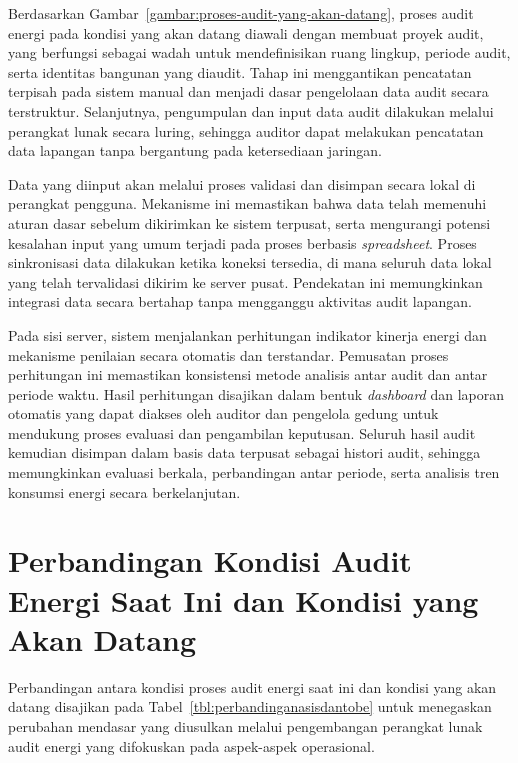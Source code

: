 Berdasarkan Gambar~\ref{gambar:proses-audit-yang-akan-datang}, proses audit energi pada kondisi yang akan datang diawali dengan membuat proyek audit, yang berfungsi sebagai wadah untuk mendefinisikan ruang lingkup, periode audit, serta identitas bangunan yang diaudit. Tahap ini menggantikan pencatatan terpisah pada sistem manual dan menjadi dasar pengelolaan data audit secara terstruktur. Selanjutnya, pengumpulan dan input data audit dilakukan melalui perangkat lunak secara luring, sehingga auditor dapat melakukan pencatatan data lapangan tanpa bergantung pada ketersediaan jaringan.

Data yang diinput akan melalui proses validasi dan disimpan secara lokal di perangkat pengguna. Mekanisme ini memastikan bahwa data telah memenuhi aturan dasar sebelum dikirimkan ke sistem terpusat, serta mengurangi potensi kesalahan input yang umum terjadi pada proses berbasis \textit{spreadsheet}. Proses sinkronisasi data dilakukan ketika koneksi tersedia, di mana seluruh data lokal yang telah tervalidasi dikirim ke server pusat. Pendekatan ini memungkinkan integrasi data secara bertahap tanpa mengganggu aktivitas audit lapangan.

Pada sisi server, sistem menjalankan perhitungan indikator kinerja energi dan mekanisme penilaian secara otomatis dan terstandar. Pemusatan proses perhitungan ini memastikan konsistensi metode analisis antar audit dan antar periode waktu. Hasil perhitungan disajikan dalam bentuk \textit{dashboard} dan laporan otomatis yang dapat diakses oleh auditor dan pengelola gedung untuk mendukung proses evaluasi dan pengambilan keputusan. Seluruh hasil audit kemudian disimpan dalam basis data terpusat sebagai histori audit, sehingga memungkinkan evaluasi berkala, perbandingan antar periode, serta analisis tren konsumsi energi secara berkelanjutan.

\section{Perbandingan Kondisi Audit Energi Saat Ini dan Kondisi yang Akan Datang}
Perbandingan antara kondisi proses audit energi saat ini dan kondisi yang akan datang disajikan pada Tabel~\ref{tbl:perbandinganasisdantobe} untuk menegaskan perubahan mendasar yang diusulkan melalui pengembangan perangkat lunak audit energi yang difokuskan pada aspek-aspek operasional.



